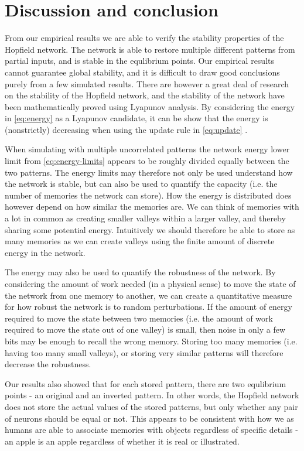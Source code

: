 \section{Discussion and conclusion}

From our empirical results we are able to verify the stability properties of the Hopfield network. The network is able to restore multiple different patterns from partial inputs, and is stable in the equlibrium points. Our empirical results cannot guarantee global stability, and it is difficult to draw good conclusions purely from a few simulated results. There are however a great deal of research on the stability of the Hopfield network, and the stability of the network have been mathematically proved using Lyapunov analysis. By considering the energy in \cref{eq:energy} as a Lyapunov candidate, it can be show that the energy is (nonstrictly) decreasing when using the update rule in \cref{eq:update} \cite{lyapnuv-stability}.

When simulating with multiple uncorrelated patterns the network energy lower limit from \cref{eq:energy-limits} appears to be roughly divided equally between the two patterns. The energy limits may therefore not only be used understand how the network is stable, but can also be used to quantify the capacity (i.e. the number of memories the network can store). How the energy is distributed does however depend on how similar the memories are. We can think of memories with a lot in common as creating smaller valleys within a larger valley, and thereby sharing some potential energy. Intuitively we should therefore be able to store as many memories as we can create valleys using the finite amount of discrete energy in the network.

The energy may also be used to quantify the robustness of the network. By considering the amount of work needed (in a physical sense) to move the state of the network from one memory to another, we can create a quantitative measure for how robust the network is to random perturbations. If the amount of energy required to move the state between two memories (i.e. the amount of work required to move the state out of one valley) is small, then noise in only a few bits may be enough to recall the wrong memory. Storing too many memories (i.e. having too many small valleys), or storing very similar patterns will therefore decrease the robustness.

Our results also showed that for each stored pattern, there are two equlibrium points - an original and an inverted pattern. In other words, the Hopfield network does not store the actual values of the stored patterns, but only whether any pair of neurons should be equal or not. This appears to be consistent with how we as humans are able to associate memories with objects regardless of specific details - an apple is an apple regardless of whether it is real or illustrated. 

